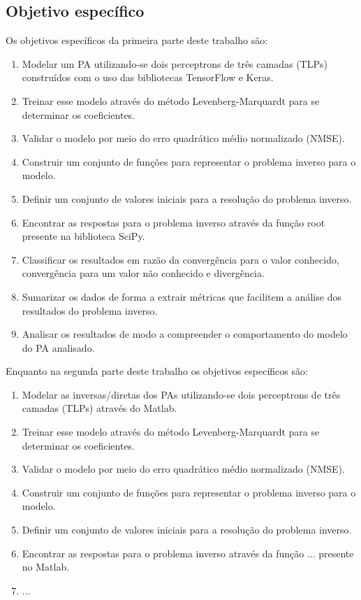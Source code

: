 \subsection{Objetivo específico} \label{ssec:introd-obje-espec}
Os objetivos específicos da primeira parte deste trabalho são:

\begin{enumerate}
    \item Modelar um PA utilizando-se dois perceptrons de três camadas (TLPs) construídos com o uso das bibliotecas TensorFlow e Keras.
    \item Treinar esse modelo através do método Levenberg-Marquardt para se determinar os coeficientes.
    \item Validar o modelo por meio do erro quadrático médio normalizado (NMSE).
    \item Construir um conjunto de funções para representar o problema inverso para o modelo.
    \item Definir um conjunto de valores iniciais para a resolução do problema inverso.
    \item Encontrar as respostas para o problema inverso através da função root presente na biblioteca SciPy.
    \item Classificar os resultados em razão da convergência para o valor conhecido, convergência para um valor não conhecido e divergência.
    \item Sumarizar os dados de forma a extrair métricas que facilitem a análise dos resultados do problema inverso.
    \item Analisar os resultados de modo a compreender o comportamento do modelo do PA analisado.
\end{enumerate}

Enquanto na segunda parte deste trabalho os objetivos específicos são:

\begin{enumerate}
    \item Modelar as inversas/diretas dos PAs utilizando-se dois perceptrons de três camadas (TLPs) através do Matlab.
    \item Treinar esse modelo através do método Levenberg-Marquardt para se determinar os coeficientes.
    \item Validar o modelo por meio do erro quadrático médio normalizado (NMSE).
    \item Construir um conjunto de funções para representar o problema inverso para o modelo.
    \item Definir um conjunto de valores iniciais para a resolução do problema inverso.
    \item Encontrar as respostas para o problema inverso através da função ... presente no Matlab.
    \item ...
\end{enumerate}

